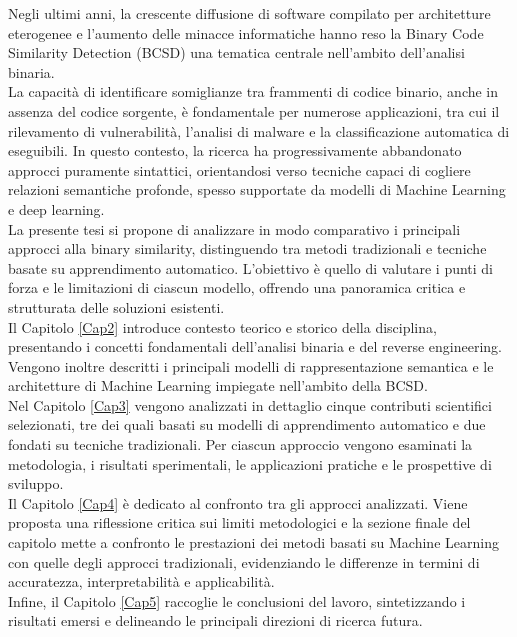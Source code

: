 \documentclass[12pt,a4paper,openright,twoside]{report}
\begin{document}
Negli ultimi anni, la crescente diffusione di software compilato per architetture eterogenee e l’aumento delle minacce informatiche hanno reso la Binary Code Similarity Detection (BCSD) una tematica centrale nell’ambito dell’analisi binaria.\\
La capacità di identificare somiglianze tra frammenti di codice binario, anche in assenza del codice sorgente, è fondamentale per numerose applicazioni, tra cui il rilevamento di vulnerabilità, l’analisi di malware e la classificazione automatica di eseguibili. In questo contesto, la ricerca ha progressivamente abbandonato approcci puramente sintattici, orientandosi verso tecniche capaci di cogliere relazioni semantiche profonde, spesso supportate da modelli di Machine Learning e deep learning.\\
La presente tesi si propone di analizzare in modo comparativo i principali approcci alla binary similarity, distinguendo tra metodi tradizionali e tecniche basate su apprendimento automatico. L’obiettivo è quello di valutare i punti di forza e le limitazioni di ciascun modello, offrendo una panoramica critica e strutturata delle soluzioni esistenti.\\
Il Capitolo \ref{Cap2} introduce contesto teorico e storico della disciplina, presentando i concetti fondamentali dell’analisi binaria e del reverse engineering. Vengono inoltre descritti i principali modelli di rappresentazione semantica e le architetture di Machine Learning impiegate nell’ambito della BCSD.\\
Nel Capitolo \ref{Cap3} vengono analizzati in dettaglio cinque contributi scientifici selezionati, tre dei quali basati su modelli di apprendimento automatico e due fondati su tecniche tradizionali. Per ciascun approccio vengono esaminati la metodologia, i risultati sperimentali, le applicazioni pratiche e le prospettive di sviluppo.\\
Il Capitolo \ref{Cap4} è dedicato al confronto tra gli approcci analizzati. Viene proposta una riflessione critica sui limiti metodologici e la sezione finale del capitolo mette a confronto le prestazioni dei metodi basati su Machine Learning con quelle degli approcci tradizionali, evidenziando le differenze in termini di accuratezza, interpretabilità e applicabilità.\\
Infine, il Capitolo \ref{Cap5} raccoglie le conclusioni del lavoro, sintetizzando i risultati emersi e delineando le principali direzioni di ricerca futura.

\clearpage{\pagestyle{empty}\cleardoublepage}
\end{document}

